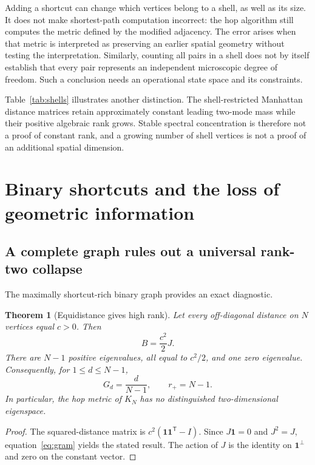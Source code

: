 \documentclass[11pt,letterpaper]{article}
\newtheorem{theorem}{Theorem}[section]
\theoremstyle{definition}
\theoremstyle{remark}
\newcommand{\one}{\mathbf 1}
\begin{document}
Adding a shortcut can change which vertices belong to a shell, as well as its size. It does not make shortest-path computation incorrect: the hop algorithm still computes the metric defined by the modified adjacency. The error arises when that metric is interpreted as preserving an earlier spatial geometry without testing the interpretation. Similarly, counting all pairs in a shell does not by itself establish that every pair represents an independent microscopic degree of freedom. Such a conclusion needs an operational state space and its constraints.

Table~\ref{tab:shells} illustrates another distinction. The shell-restricted Manhattan distance matrices retain approximately constant leading two-mode mass while their positive algebraic rank grows. Stable spectral concentration is therefore not a proof of constant rank, and a growing number of shell vertices is not a proof of an additional spatial dimension.
\begin{table}[htbp]
\centering

\caption{New exact-distance shell calculations. Distances are measured through the ambient square lattice, not along the shell perimeter. $n_+$ grows while $G_2$ and $r_+$ remain approximately stable.}
\label{tab:shells}
\end{table}

\section{Binary shortcuts and the loss of geometric information}\label{sec:binary}
\subsection{A complete graph rules out a universal rank-two collapse}
The maximally shortcut-rich binary graph provides an exact diagnostic.
\begin{theorem}[Equidistance gives high rank]\label{thm:complete}
Let every off-diagonal distance on $N$ vertices equal $c>0$. Then
\begin{equation}
 B=\frac{c^2}{2}J.
\end{equation}
There are $N-1$ positive eigenvalues, all equal to $c^2/2$, and one zero eigenvalue. Consequently, for $1\leq d\leq N-1$,
\begin{equation}
 G_d=\frac{d}{N-1},\qquad r_+=N-1.
 \label{eq:complete}
\end{equation}
In particular, the hop metric of $K_N$ has no distinguished two-dimensional eigenspace.
\end{theorem}
\begin{proof}
The squared-distance matrix is $c^2(\one\one^{\mathsf T}-I)$. Since $J\one=0$ and $J^2=J$, equation~\eqref{eq:gram} yields the stated result. The action of $J$ is the identity on $\one^\perp$ and zero on the constant vector.
\end{proof}
\end{document}
